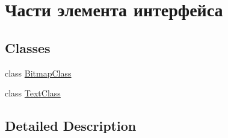 \hypertarget{group___interface_blocks}{}\section{Части элемента интерфейса}
\label{group___interface_blocks}
\subsection*{Classes}
\begin{DoxyCompactItemize}
\item 
class \hyperlink{class_bitmap_class}{Bitmap\+Class}
\item 
class \hyperlink{class_text_class}{Text\+Class}
\end{DoxyCompactItemize}


\subsection{Detailed Description}
